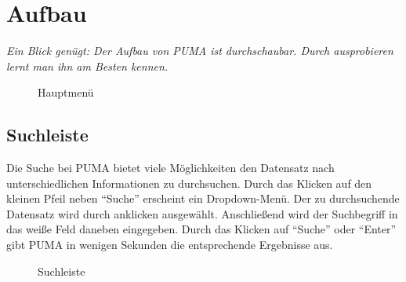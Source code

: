 \chapter{Aufbau}
\textit{Ein Blick genügt: Der Aufbau von PUMA ist durchschaubar. Durch ausprobieren lernt man ihn am Besten kennen.}
\begin{figure}[h!]
 \centering
 \caption{Hauptmenü}
 \label{figure003}
\end{figure} 
\section{Suchleiste}
Die Suche bei PUMA bietet viele Möglichkeiten den Datensatz nach unterschiedlichen Informationen zu durchsuchen. Durch das Klicken auf den kleinen Pfeil neben \enquote{Suche} erscheint ein Dropdown-Menü. Der zu durchsuchende Datensatz wird durch anklicken ausgewählt. Anschließend wird der Suchbegriff in das weiße Feld daneben eingegeben. Durch das Klicken auf \enquote{Suche} oder \enquote{Enter} gibt PUMA in wenigen Sekunden die entsprechende Ergebnisse aus.

\begin{figure}[h!]
 \centering
 \caption{Suchleiste}
 \label{figure004}
\end{figure}  

